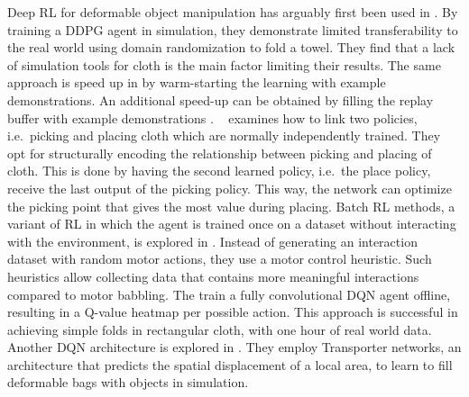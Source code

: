\documentclass[\home/main.tex]{subfiles}
\begin{document}
Deep RL for deformable object manipulation has arguably first been used in \autocite{Matas2018}. By training a DDPG agent in simulation, they demonstrate limited transferability to the real world using domain randomization to fold a towel. They find that a lack of simulation tools for cloth is the main factor limiting their results. The same approach is speed up in \autocite{Jangir2020} by warm-starting the learning with example demonstrations. An additional speed-up can be obtained by filling the replay buffer with example demonstrations \autocite{Tsurumine2019}. ~\textcite{Wu2020} examines how to link two policies, i.e.\ picking and placing cloth which are normally independently trained. They opt for structurally encoding the relationship between picking and placing of cloth. This is done by having the second learned policy, i.e.\ the place policy, receive the last output of the picking policy. This way, the network can optimize the picking point that gives the most value during placing. Batch RL methods, a variant of RL in which the agent is trained once on a dataset without interacting with the environment, is explored in  \autocite{lee2020learning}. Instead of generating an interaction dataset with random motor actions, they use a motor control heuristic. Such heuristics allow collecting data that contains more meaningful interactions compared to motor babbling. The train a fully convolutional DQN agent offline, resulting in a Q-value heatmap per possible action. This approach is successful in achieving simple folds in rectangular cloth, with one hour of real world data. Another DQN architecture is explored in \autocite{seita2021learning}. They employ Transporter networks, an architecture that predicts the spatial displacement of a local area, to learn to fill deformable bags with objects in simulation.
\end{document}
